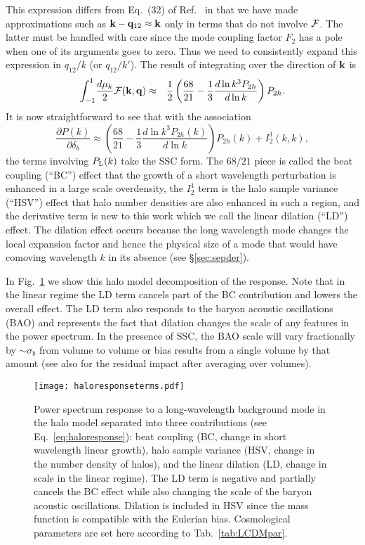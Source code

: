 \documentclass[prd,twocolumn,amsmath,amssymb,floatfix,superscriptaddress]{revtex4-1}
\newcommand{\wh}[1]{{#1}}
\newcommand{\bk}{{\bf k}}
\newcommand{\bq}{{\bf q}}
\newcommand{\lin}{{\rm L}}
\newcommand{\fpole}{{\cal F}}
\begin{document}
\wh{
This expression differs from {Eq.~(32)}  of Ref.~\cite{Takada:2013wfa} 
in that we have 
made approximations such as $\bk -\bq_{12} \approx \bk$ only in terms that do not
involve  $\fpole$.}  
The latter must be handled with care since 
the mode coupling factor $F_2$ has a pole when one of its arguments
goes to zero.    Thus we need to consistently expand this expression in $q_{12}/k$ (or 
$q_{12}/k'$).   
The result of integrating over the direction of $\bk$ is 
 \begin{eqnarray}
\int^{1}_{-1}\!\frac{d\mu_k}{2}
\fpole (\bk,\bq) &\approx & \frac{1}{2}\left(
\frac{68}{21}-\frac{1}{3}\frac{d\ln k^3 P_{2h}}{d\ln k}
\right)P_{2h}.
\end{eqnarray}
%
It is now straightforward to see that with the association 
%
\begin{equation}
\frac{\partial  P(k)}{\partial  \delta_b} 
\approx {\left(\frac{68}{21}-\frac{1}{3}\frac{d\ln k^3P_{2h}(k)}{d\ln k}\right)
P_{2h}(k)
+ I_2^1(k,k)},
\label{eq:haloresponse}
\end{equation}
the terms involving $P_\lin(k)$ take the SSC form.
The $68/21$ piece is called
the beat coupling (``BC'') effect that the growth of a short wavelength perturbation is enhanced in a large scale overdensity, the $I_2^1$ term is the halo sample variance (``HSV'') effect
that halo number densities are also enhanced in such a region,
and the derivative term is new to this work which we call the linear dilation (``LD'') effect.
The dilation effect occurs because the long wavelength mode changes the local expansion factor and hence the physical size of a mode that would have comoving wavelength $k$ in its absence (see \S \ref{sec:sepder}). 


In Fig.~\ref{fig:halo_terms} we show this halo model decomposition of the response.  
Note that in the linear regime the LD term cancels part of the BC contribution and
lowers the overall effect.   The LD term also responds to the baryon acoustic oscillations (BAO)
and represents the fact that dilation changes the scale of any features in the power spectrum.  
In the presence of SSC, the BAO scale will vary fractionally by  $\sim \sigma_b$ from 
volume to volume or bias results from a single volume by that amount
(see also \cite{Crocce:2007dt,SherwinZaldarriaga:12} for the residual impact 
 after averaging over volumes).


\begin{figure}[tb]
\centering
    \texttt{[image: haloresponseterms.pdf]}
    \caption{\footnotesize Power spectrum response to a long-wavelength background mode in the halo
 model separated into three contributions {(see Eq.~\ref{eq:haloresponse})}:  beat coupling (BC, change in short wavelength linear growth),  halo sample
 variance (HSV, change in the number density of halos), and the linear
 dilation (LD,  change in scale in the linear regime). The LD term is negative  and partially cancels the BC effect while also changing the scale of the baryon acoustic oscillations.  Dilation is included in HSV since the mass
    function is compatible with the Eulerian bias.  Cosmological parameters are set
    here according to Tab.~\ref{tab:LCDMpar}.
    }
    \label{fig:halo_terms}
\end{figure}
\end{document}
